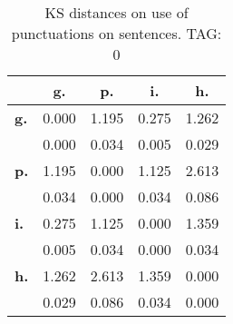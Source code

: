 \begin{table}[h!]
\begin{center}
\begin{tabular}{| l || c | c | c | c |}\hline
 & {\bf g.} & {\bf p.} & {\bf i.} & {\bf h.} \\\hline\hline
{\bf g.} & 0.000 & 1.195 & 0.275 & 1.262 \\
{\bf } & 0.000 & 0.034 & 0.005 & 0.029 \\\hline
{\bf p.} & 1.195 & 0.000 & 1.125 & 2.613 \\
{\bf } & 0.034 & 0.000 & 0.034 & 0.086 \\\hline
{\bf i.} & 0.275 & 1.125 & 0.000 & 1.359 \\
{\bf } & 0.005 & 0.034 & 0.000 & 0.034 \\\hline
{\bf h.} & 1.262 & 2.613 & 1.359 & 0.000 \\
{\bf } & 0.029 & 0.086 & 0.034 & 0.000 \\\hline
\end{tabular}
\caption{KS distances on use of punctuations on sentences. TAG: 0}
\end{center}
\end{table}